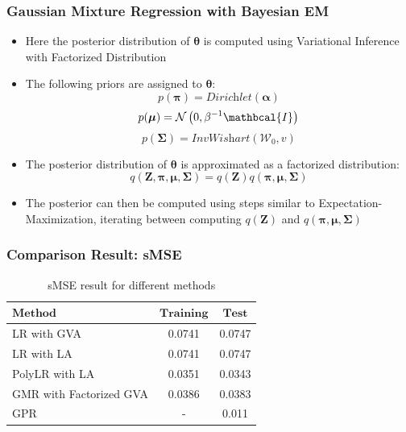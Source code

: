 \documentclass[xcolor=table]{beamer}
\begin{document}
\begin{frame}
\frametitle{Gaussian Mixture Regression with Bayesian EM}
\centering
\begin{itemize}
\item Here the posterior distribution of $\bm{\theta}$ is computed using Variational Inference with Factorized Distribution
\item The following priors are assigned to $\bm{\theta}$:
\begin{equation}
p(\bm{\pi}) = \textit{Dirichlet}(\bm{\alpha})
\end{equation}
\begin{equation}
p(\bm{\mu}) = \mathcal{N}\left(0, \beta^{-1} \mathbcal{I}\right)
\end{equation}
\begin{equation}
p(\bm{\Sigma}) = \textit{InvWishart}(\bm{\mathcal{W}}_0,v)
\end{equation}

\item The posterior distribution of $\bm{\theta}$ is approximated as a factorized distribution:
\begin{equation}
q(\bm{Z}, \bm{\pi},\bm{\mu}, \bm{\Sigma}) = q(\bm{Z})q(\bm{\pi},\bm{\mu}, \bm{\Sigma})
\end{equation}


\item The posterior can then be computed using steps similar to Expectation-Maximization, iterating between computing $q(\bm{Z})$ and $q(\bm{\pi},\bm{\mu}, \bm{\Sigma})$
\end{itemize}
\end{frame}

\begin{frame}
\frametitle{Comparison Result: sMSE}
\centering

\renewcommand{\arraystretch}{1.3}
\begin{table}[t]
\centering
\caption{sMSE result for different methods}
\begin{tabular}{l c c}
\hline
$\textbf{Method}$ & $\textbf{Training}$ & $\textbf{Test}$ \\ \hline 
LR with GVA     	& 0.0741	& 0.0747	  \\
LR with LA      & 0.0741 	& 0.0747 	  \\
PolyLR with LA    	& 0.0351	& 0.0343	  \\
GMR with Factorized GVA &   0.0386	& 0.0383 \\
GPR &   -	& 0.011 \\
\hline
\end{tabular}
\label{tab:cartesian}
\end{table}



\end{frame}
\end{document}
